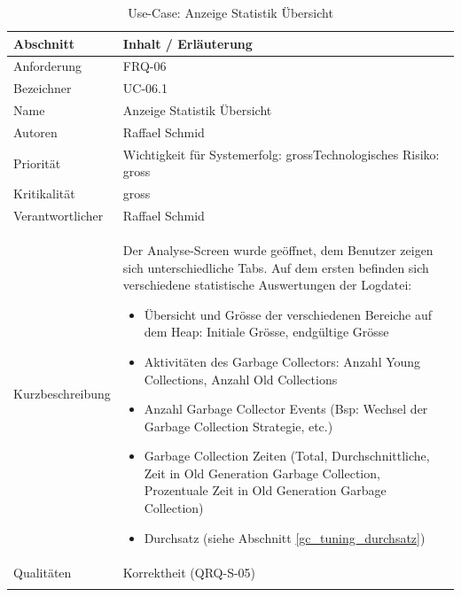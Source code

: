 \begin{longtable}{|p{4cm}|p{10.5cm}|}
\hline
   \textbf{Abschnitt} & \textbf{Inhalt / Erläuterung} \\\hline
   Anforderung & FRQ-06\\\hline
   Bezeichner & UC-06.1\\\hline
   Name & Anzeige Statistik Übersicht\\\hline
   Autoren & Raffael Schmid\\\hline
   Priorität & Wichtigkeit für Systemerfolg: gross\newline Technologisches Risiko: gross\\\hline
   Kritikalität & gross\\\hline
   Verantwortlicher & Raffael Schmid\\\hline
   Kurzbeschreibung & Der Analyse-Screen wurde geöffnet, dem Benutzer zeigen sich unterschiedliche Tabs. Auf dem ersten befinden sich verschiedene statistische Auswertungen der Logdatei:
   \begin{itemize}
	\item Übersicht und Grösse der verschiedenen Bereiche auf dem Heap: Initiale Grösse, endgültige Grösse
	\item Aktivitäten des Garbage Collectors: Anzahl Young Collections, Anzahl Old Collections
	\item Anzahl Garbage Collector Events (Bsp: Wechsel der Garbage Collection Strategie, etc.)
	\item Garbage Collection Zeiten (Total, Durchschnittliche, Zeit in Old Generation Garbage Collection, Prozentuale Zeit in Old Generation Garbage Collection)
	\item Durchsatz (siehe Abschnitt \ref{gc_tuning_durchsatz})
   \end{itemize}
 \\\hline
   Qualitäten & Korrektheit (QRQ-S-05)\\\hline
\caption{Use-Case: Anzeige Statistik Übersicht}
\end{longtable}

